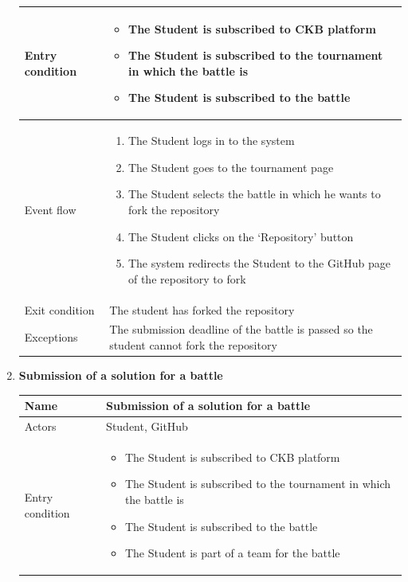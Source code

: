 \begin{enumerate}[label=UC\arabic*:]
\begin{tabular}{|p{3cm}|p{8cm}|}
        Entry condition &
        \begin{itemize}
            \item The Student is subscribed to CKB platform
            \item The Student is subscribed to the tournament in which the battle is
            \item The Student is subscribed to the battle
        \end{itemize} \\
        \hline
        Event flow &
        \begin{enumerate}[label=\arabic*.]
            \item The Student logs in to the system
            \item The Student goes to the tournament page
            \item The Student selects the battle in which he wants to fork the repository
            \item The Student clicks on the `Repository' button
            \item The system redirects the Student to the GitHub page of the repository to fork
        \end{enumerate} \\
        \hline
        Exit condition & The student has forked the repository \\
        \hline
        Exceptions & The submission deadline of the battle is passed so the student cannot fork the repository \\
        \hline
    \end{tabular}
    \item \textbf{Submission of a solution for a battle} \\
    \begin{tabular}{|p{3cm}|p{8cm}|}
        \hline
        Name & Submission of a solution for a battle \\
        \hline
        Actors & Student, GitHub \\
        \hline
        Entry condition &
        \begin{itemize}
            \item The Student is subscribed to CKB platform
            \item The Student is subscribed to the tournament in which the battle is
            \item The Student is subscribed to the battle
            \item The Student is part of a team for the battle

\end{itemize}
\end{tabular}
\end{enumerate}
